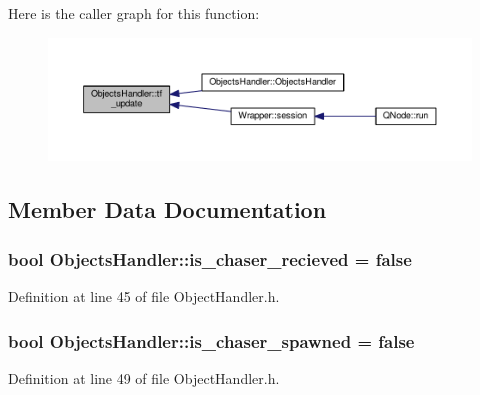 Here is the caller graph for this function\+:
\nopagebreak
\begin{figure}[H]
\begin{center}
\leavevmode
\includegraphics[width=350pt]{class_objects_handler_a6896e4f9863bd1a4fbc8498d0cb20f09_icgraph}
\end{center}
\end{figure}




\subsection{Member Data Documentation}
\subsubsection[{\texorpdfstring{is\+\_\+chaser\+\_\+recieved}{is_chaser_recieved}}]{\setlength{\rightskip}{0pt plus 5cm}bool Objects\+Handler\+::is\+\_\+chaser\+\_\+recieved = false}\hypertarget{class_objects_handler_a86f8528ff5697c87fc6a3fcd6ba0f42c}{}\label{class_objects_handler_a86f8528ff5697c87fc6a3fcd6ba0f42c}


Definition at line 45 of file Object\+Handler.\+h.

\subsubsection[{\texorpdfstring{is\+\_\+chaser\+\_\+spawned}{is_chaser_spawned}}]{\setlength{\rightskip}{0pt plus 5cm}bool Objects\+Handler\+::is\+\_\+chaser\+\_\+spawned = false}\hypertarget{class_objects_handler_a16165ae7c0167ba8d2a0151a8a4fbfd5}{}\label{class_objects_handler_a16165ae7c0167ba8d2a0151a8a4fbfd5}


Definition at line 49 of file Object\+Handler.\+h.

